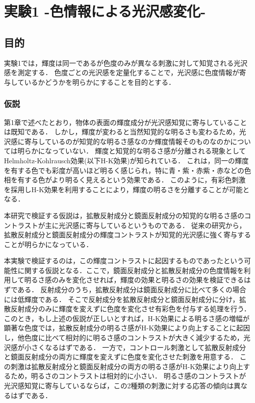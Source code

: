 \chapter{実験1 -色情報による光沢感変化-}

    \section{目的}
        実験1では，輝度は同一であるが色度のみが異なる刺激に対して知覚される光沢感を測定する．
        色度ごとの光沢感を定量化することで，光沢感に色度情報が寄与しているかどうかを明らかにすることを目的とする．

        \subsection{仮説}
            第1章で述べたとおり，物体の表面の輝度成分が光沢感知覚に寄与していることは既知である．
            しかし，輝度が変わると当然知覚的な明るさも変わるため，光沢感に寄与しているのが知覚的な明るさ感なのか輝度情報そのものなのかについては明らかになっていない．
            輝度と知覚的な明るさ感が分離される現象としてHelmholtz-Kohlrausch効果(以下H-K効果)が知られている．
            これは，同一の輝度を有する色でも彩度が高いほど明るく感じられ，特に青・紫・赤紫・赤などの色相を有する色がより明るく見えるという効果である．
            このように，有彩色刺激を採用しH-K効果を利用することにより，輝度の明るさを分離することが可能となる．

            本研究で検証する仮説は，拡散反射成分と鏡面反射成分の知覚的な明るさ感のコントラストが主に光沢感に寄与しているというものである．
            従来の研究から，拡散反射成分と鏡面反射成分の輝度コントラストが知覚的光沢感に強く寄与することが明らかになっている．\cite{Hunter}

            本実験で検証するのは，この輝度コントラストに起因するものであったという可能性に関する仮説となる．ここで，鏡面反射成分と拡散反射成分の色度情報を利用して明るさ感のみを変化させれば，輝度の効果と明るさの効果を検証できるはずである．
            反射成分のうち，拡散反射成分は鏡面反射成分に比べて多くの場合には低輝度である．
            そこで反射成分を拡散反射成分と鏡面反射成分に分け，拡散反射成分のみに輝度を変えずに色度を変化させ有彩色を付与する処理を行う．
            このとき，もし上述の仮説が正しいとすれば，H-K効果による明るさ感の増幅が顕著な色度では，拡散反射成分の明るさ感がH-K効果により向上することに起因し，他色度に比べて相対的に明るさ感のコントラストが大きく減少するため，光沢感が小さくなるはずである．
            一方で，コントロール刺激として拡散反射成分と鏡面反射成分の両方に輝度を変えずに色度を変化させた刺激を用意する．
            この刺激は拡散反射成分と鏡面反射成分の両方の明るさ感がH-K効果により向上するため，明るさのコントラストは相対的に小さい．
            明るさ感のコントラストが光沢感知覚に寄与しているならば，この2種類の刺激に対する応答の傾向は異なるはずである．


